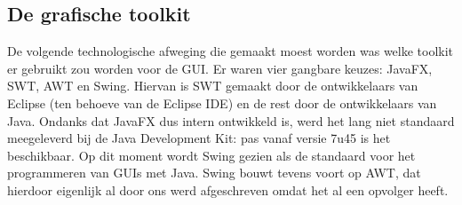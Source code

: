 \documentclass[a4paper,11pt,titlepage]{scrartcl}
\begin{document}
\subsection{De grafische toolkit}
De volgende technologische afweging die gemaakt moest worden was welke toolkit er gebruikt zou worden voor de GUI. Er waren vier gangbare keuzes: JavaFX, SWT, AWT en Swing. Hiervan is SWT gemaakt door de ontwikkelaars van Eclipse (ten behoeve van de Eclipse IDE) en de rest door de ontwikkelaars van Java. Ondanks dat JavaFX dus intern ontwikkeld is, werd het lang niet standaard meegeleverd bij de Java Development Kit: pas vanaf versie 7u45 is het beschikbaar. Op dit moment wordt Swing gezien als de standaard voor het programmeren van GUIs met Java. Swing bouwt tevens voort op AWT, dat hierdoor eigenlijk al door ons werd afgeschreven omdat het al een opvolger heeft.\\
\end{document}
